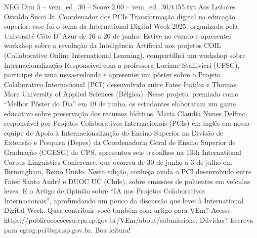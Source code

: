 \begin{textsample}{NEG Dim 5 – vem\_ed\_30 – Score 2.00 – vem\_ed\_30/t155.txt}  \label{ex:f5_neg_138}
Aos Leitores Osvaldo Succi Jr.
Coordenador dos PCIs Transformação digital na educação superior: esse foi o tema da International Digital Week 2025, organizada pela Université Côte D´Azur de 16 a 20 de junho.
Estive no evento e apresentei workshop sobre a revolução da Inteligência Artificial nos projetos COIL (Collaborative Online International Learning), compartilhei um workshop sobre Internacionalização Responsável com a professora Luciane Stallivieri (UFSC), participei de uma mesa-redonda e apresentei um pôster sobre o Projeto Colaborativo Internacional (PCI) desenvolvido entre Fatec Itatiba e Thomas More University of Applied Sciences (Bélgica).
Nesse projeto, premiado como “Melhor Pôster do Dia” em 19 de junho, os estudantes elaboraram um game educativo sobre preservação dos recursos hídricos.
Maria Claudia Nunes Delfino, responsável por Projetos Colaborativos Internacionais (PCIs) em inglês em nossa equipe de Apoio à Internacionalização do Ensino Superior na Divisão de Extensão e Pesquisa (Depes) da Coordenadoria Geral de Ensino Superior de Graduação (CGESG) do CPS, apresentou seis trabalhos na 13th International Corpus Linguistics Conference, que ocorreu de 30 de junho a 3 de julho em Birmingham, Reino Unido.
Nesta edição, conheça ainda o PCI desenvolvido entre Fatec Santo André e DUOC UC (Chile), sobre emissões de poluentes em veículos leves.
E o Artigo de Opinião sobre “IA nos Projetos Colaborativos Internacionais”, aprofundando um pouco da discussão que levei à International Digital Week.
Quer contribuir você também com artigo para VEm?
Acesse https://publicacoescesu.cps.sp.gov.br/VEm/about/submissions.
Dúvidas?
Escreva para cgesg.pci@cps.sp.gov.br.
Boa leitura!

\end{textsample}
